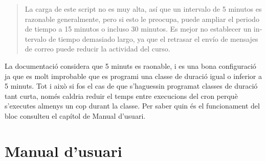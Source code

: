 \documentclass[a4paper]{report}  %
\begin{document}
\begin{otherlanguage}{spanish}
\begin{quote}
La carga de este script no es muy alta, así que un intervalo de 5 minutos es razonable generalmente, pero si esto le preocupa, puede ampliar el periodo de tiempo a 15 minutos o incluso 30 minutos. Es mejor no establecer un intervalo de tiempo demasiado largo, ya que el retrasar el envío de mensajes de correo puede reducir la actividad del curso.
\end{quote}
\end{otherlanguage}
La documentació considera que 5 minuts es raonable, i es una bona configuració ja que es molt improbable que es programi una classe  de duració igual o inferior a 5 minuts. Tot i això si fos el cas de que s'haguessin programat classes de duració tant curta, només caldria reduir el temps entre execucions del cron perquè s'executes almenys un cop durant la classe.
Per saber quin és el funcionament del bloc consulteu el capítol de Manual d'usuari.
\chapter{Manual d'usuari}
\end{document}
